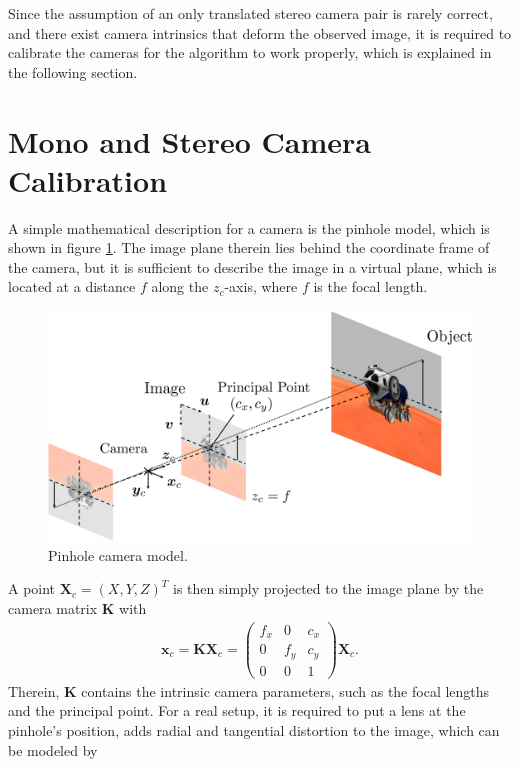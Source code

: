 Since the assumption of an only translated stereo camera pair is rarely correct, and there exist camera intrinsics that deform the observed image, it is required to calibrate the cameras for the algorithm to work properly, which is explained in the following section.
\FloatBarrier
\section{Mono and Stereo Camera Calibration}
\label{sec::32_cc}
A simple mathematical description for a camera is the pinhole model, which is shown in figure \ref{fig::32_pin_hole_camera}. The image plane therein lies behind the coordinate frame of the camera, but it is sufficient to describe the image in a virtual plane, which is located at a distance $f$ along the $z_c$-axis, where $f$ is the focal length.
\begin{figure}[h!]
	\centering
	\includegraphics[scale=.28]{chapters/03_fundamentals_of_image_processing/img/pin_hole_camera.png}
	\caption{Pinhole camera model.}
	\label{fig::32_pin_hole_camera}
\end{figure}
A point $\bm{X}_c = (X,Y,Z)^T$ is then simply projected to the image plane by the camera matrix $\bm{K}$ with
\begin{align}
	\bm{x}_c = \bm{K}\bm{X}_c = \begin{pmatrix}
	f_x & 0   & c_x \\
	0   & f_y & c_y \\
	0   & 0   & 1
	\end{pmatrix}\bm{X}_c.
	\label{eq::32_focal_intrinsics}
\end{align}
Therein, $\bm{K}$ contains the intrinsic camera parameters, such as the focal lengths and the principal point. For a real setup, it is required to put a lens at the pinhole's position, adds radial and tangential distortion to the image, which can be modeled by \cite{duane1971close}
